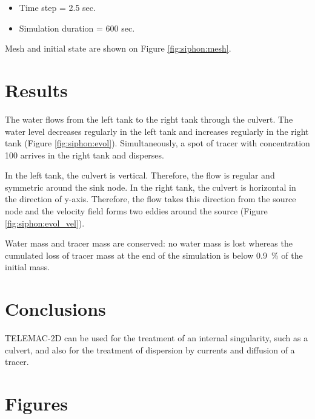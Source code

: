\begin{itemize}
\item  Time step = 2.5 sec.
\item  Simulation duration = 600 sec.
\end{itemize}

Mesh and initial state are shown on Figure \ref{fig:siphon:mesh}.

\section{ Results}

The water flows from the left tank to the right tank through the culvert. The
water level decreases regularly in the left tank and increases regularly in the
right tank (Figure \ref{fig:siphon:evol}). Simultaneously, a spot of tracer with concentration
100 arrives in the right tank and disperses.

In the left tank, the culvert is vertical. Therefore, the flow is regular and
symmetric around the sink node. In the right tank, the culvert is horizontal in
the direction of y-axis. Therefore, the flow takes this direction from the
source node and the velocity field forms two eddies around the source (Figure
\ref{fig:siphon:evol_vel}).

Water mass and tracer mass are conserved: no water mass is lost whereas the
cumulated loss of tracer mass at the end of the simulation is below 0.9~\% of
the initial mass.

\section{ Conclusions}

TELEMAC-2D can be used for the treatment of an internal singularity, such as a
culvert, and also for the treatment of dispersion by currents and diffusion of
a tracer.

\section{ Figures}

